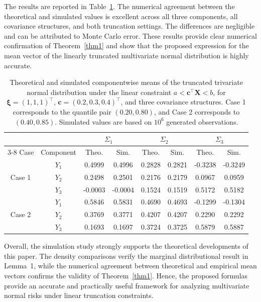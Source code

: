 \documentclass[twoside]{article}
\begin{document}
The results are reported in Table~\ref{tab:meancomp}. The numerical agreement
between the theoretical and simulated values is excellent across all three
components, all covariance structures, and both truncation settings. The
differences are negligible and can be attributed to Monte Carlo error. These
results provide clear numerical confirmation of Theorem~\ref{thm1} and show that the
proposed expression for the mean vector of the linearly truncated multivariate
normal distribution is highly accurate.

\begin{table}[ht]
	\begin{center}
		\small
	\caption{Theoretical and simulated componentwise means of the truncated trivariate normal distribution under the linear constraint \(a<\mathbf{c}^\top\mathbf{X}<b\), for \(\boldsymbol{\xi}=(1,1,1)^\top\), \(\mathbf{c}=(0.2,0.3,0.4)^\top\), and three covariance structures. Case 1 corresponds to the quantile pair \((0.20,0.80)\), and Case 2 corresponds to \((0.40,0.85)\). Simulated values are based on \(10^6\) generated observations.}
	\label{tab:meancomp}
	\begin{tabular}{cccccccc}
		\hline
		&  & \multicolumn{2}{c}{\(\Sigma_1\)} & \multicolumn{2}{c}{\(\Sigma_2\)} & \multicolumn{2}{c}{\(\Sigma_3\)} \\
		\cline{3-8}
		Case & Component & Theo. & Sim. & Theo. & Sim. & Theo. & Sim. \\
		\hline
		\multirow{3}{*}{Case 1}
		& \(Y_1\) & 0.4999 & 0.4996 & 0.2828 & 0.2821 & -0.3238 & -0.3249 \\
		& \(Y_2\) & 0.2498 & 0.2501 & 0.2176 & 0.2179 & 0.0967 & 0.0959 \\
		& \(Y_3\) & -0.0003 & -0.0004 & 0.1524 & 0.1519 & 0.5172 & 0.5182 \\
		\hline
		\multirow{3}{*}{Case 2}
		& \(Y_1\) & 0.5846 & 0.5831 & 0.4690 & 0.4693 & -0.1299 & -0.1304 \\
		& \(Y_2\) & 0.3769 & 0.3771 & 0.4207 & 0.4207 & 0.2290 & 0.2292 \\
		& \(Y_3\) & 0.1693 & 0.1697 & 0.3724 & 0.3725 & 0.5879 & 0.5887 \\
		\hline
	\end{tabular}
	\end{center}
\end{table}

Overall, the simulation study strongly supports the theoretical developments of
this paper. The density comparisons verify the marginal distributional result
in Lemma~1, while the numerical agreement between theoretical and empirical
mean vectors confirms the validity of Theorem~\ref{thm1}. Hence, the proposed formulas
provide an accurate and practically useful framework for analyzing multivariate
normal risks under linear truncation constraints.
\end{document}
